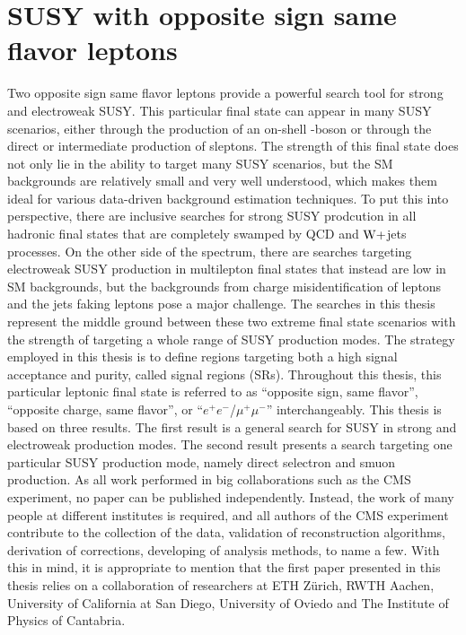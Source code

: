 \section{SUSY with opposite sign same flavor leptons}\label{sec:susyOS2l}
\noindent\justify
Two opposite sign same flavor leptons provide a powerful search tool for strong and electroweak SUSY. 
This particular final state can appear in many SUSY scenarios, either through the production of an on-shell \PZ-boson or through the direct or intermediate production of sleptons. 
The strength of this final state does not only lie in the ability to target many SUSY scenarios, but the SM backgrounds are relatively small and very well understood, which makes them ideal for various data-driven background estimation techniques. 
To put this into perspective, there are inclusive searches for strong SUSY prodcution in all hadronic final states that are completely swamped by QCD and $\mathrm{W}+$jets processes. 
On the other side of the spectrum, there are searches targeting electroweak SUSY production in multilepton final states that instead are low in SM backgrounds, but the backgrounds from charge misidentification of leptons and the jets faking leptons pose a major challenge. 
The searches in this thesis represent the middle ground between these two extreme final state scenarios with the strength of targeting a whole range of SUSY production modes.   
The strategy employed in this thesis is to define regions targeting both a high signal acceptance and purity, called signal regions (SRs).
Throughout this thesis, this particular leptonic final state is referred to as ``opposite sign, same flavor'', ``opposite charge, same flavor'', or ``$e^{+}e^{-}$/$\mu^{+}\mu^{-}$'' interchangeably. 
\newpara
\noindent\justify
This thesis is based on three results. 
The first result \cite{Sirunyan:2017qaj} is a general search for SUSY in strong and electroweak production modes. 
The second result \cite{Sirunyan:2018nwe} presents a search targeting one particular SUSY production mode, namely direct selectron and smuon production.  
As all work performed in big collaborations such as the CMS experiment, no paper can be published independently. 
Instead, the work of many people at different institutes is required, and all authors of the CMS experiment contribute to the collection of the data, validation of reconstruction algorithms, derivation of corrections, developing of analysis methods, to name a few. 
With this in mind, it is appropriate to mention that the first paper presented in this thesis relies on a collaboration of researchers at ETH Z\"{u}rich, RWTH Aachen, University of California at San Diego, University of Oviedo and The Institute of Physics of Cantabria. 
